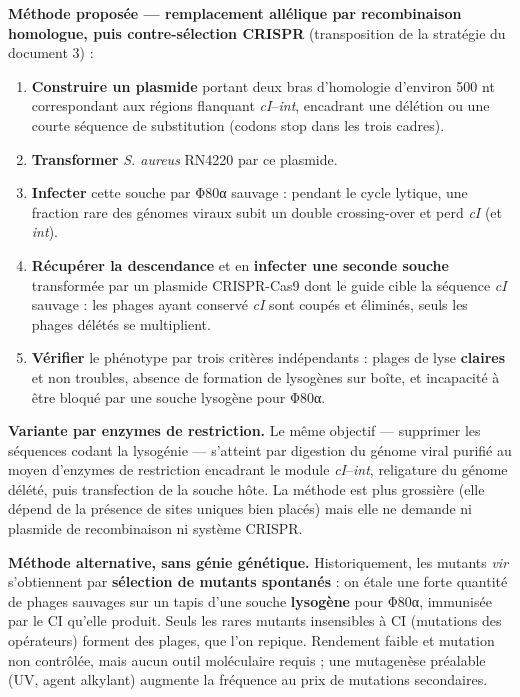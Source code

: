 \documentclass[11pt,a4paper]{article}
\providecommand{\tightlist}{\setlength{\itemsep}{0pt}\setlength{\parskip}{0pt}}
\begin{document}
\textbf{Méthode proposée --- remplacement allélique par recombinaison homologue, puis contre-sélection CRISPR} (transposition de la stratégie du document 3) :

\begin{enumerate}
\def\labelenumi{\arabic{enumi}.}
\tightlist
\item
  \textbf{Construire un plasmide} portant deux bras d'homologie d'environ 500 nt correspondant aux régions flanquant \emph{cI}--\emph{int}, encadrant une délétion ou une courte séquence de substitution (codons stop dans les trois cadres).
\item
  \textbf{Transformer} \emph{S. aureus} RN4220 par ce plasmide.
\item
  \textbf{Infecter} cette souche par Φ80α sauvage : pendant le cycle lytique, une fraction rare des génomes viraux subit un double crossing-over et perd \emph{cI} (et \emph{int}).
\item
  \textbf{Récupérer la descendance} et en \textbf{infecter une seconde souche} transformée par un plasmide CRISPR-Cas9 dont le guide cible la séquence \emph{cI} sauvage : les phages ayant conservé \emph{cI} sont coupés et éliminés, seuls les phages délétés se multiplient.
\item
  \textbf{Vérifier} le phénotype par trois critères indépendants : plages de lyse \textbf{claires} et non troubles, absence de formation de lysogènes sur boîte, et incapacité à être bloqué par une souche lysogène pour Φ80α.
\end{enumerate}

\textbf{Variante par enzymes de restriction.} Le même objectif --- supprimer les séquences codant la lysogénie --- s'atteint par digestion du génome viral purifié au moyen d'enzymes de restriction encadrant le module \emph{cI}--\emph{int}, religature du génome délété, puis transfection de la souche hôte. La méthode est plus grossière (elle dépend de la présence de sites uniques bien placés) mais elle ne demande ni plasmide de recombinaison ni système CRISPR.

\textbf{Méthode alternative, sans génie génétique.} Historiquement, les mutants \emph{vir} s'obtiennent par \textbf{sélection de mutants spontanés} : on étale une forte quantité de phages sauvages sur un tapis d'une souche \textbf{lysogène} pour Φ80α, immunisée par le CI qu'elle produit. Seuls les rares mutants insensibles à CI (mutations des opérateurs) forment des plages, que l'on repique. Rendement faible et mutation non contrôlée, mais aucun outil moléculaire requis ; une mutagenèse préalable (UV, agent alkylant) augmente la fréquence au prix de mutations secondaires.
\end{document}
